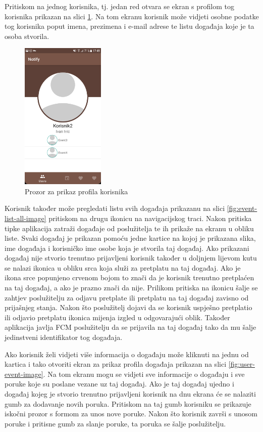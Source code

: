 \documentclass[times, utf8, zavrsni]{fer}
\begin{document}
{Pritiskom na jednog korisnika, tj. jedan red otvara se ekran s profilom tog korisnika prikazan na slici \ref{fig:user-profile-image}. Na tom ekranu korisnik može vidjeti osobne podatke tog korisnika poput imena, prezimena i e-mail adrese te listu događaja koje je ta osoba stvorila.

\begin{figure}[htb]
\centering
\includegraphics[width=4cm]{img/ss-user-profile.png}
\caption{Prozor za prikaz profila korisnika}
\label{fig:user-profile-image}
\end{figure}

Korisnik također može pregledati listu svih događaja prikazanu na slici \ref{fig:event-list-all-image} pritiskom na drugu ikonicu na navigacijskog traci. Nakon pritiska tipke aplikacija zatraži događaje od poslužitelja te ih prikaže na ekranu u obliku liste. Svaki događaj je prikazan pomoću jedne kartice na kojoj je prikazana slika, ime događaja i korisničko ime osobe koja je stvorila taj događaj. Ako prikazani događaj nije stvorio trenutno prijavljeni korisnik također u doljnjem lijevom kutu se nalazi ikonica u obliku srca koja služi za pretplatu na taj događaj. Ako je ikona srce popunjeno crvenom bojom to znači da je korisnik trenutno pretplaćen na taj događaj, a ako je prazno znači da nije. Prilikom pritiska na ikonicu šalje se zahtjev poslužitelju za odjavu pretplate ili pretplatu na taj događaj zavisno od prijašnjeg stanja. Nakon što poslužitelj dojavi da se korisnik uspješno pretplatio ili odjavio pretplatu ikonica mijenja izgled u odgovarajući oblik. Također aplikacija javlja FCM poslužitelju da se prijavila na taj događaj tako da mu šalje jedinstveni identifikator tog događaja.

Ako korisnik želi vidjeti više informacija o događaju može kliknuti na jednu od kartica i tako otvoriti ekran za prikaz profila događaja prikazan na slici \ref{fig:user-event-image}. Na tom ekranu mogu se vidjeti sve informacije o događaju i sve poruke koje su poslane vezane uz taj događaj. Ako je taj događaj ujedno i događaj kojeg je stvorio trenutno prijavljeni korisnik na dnu ekrana će se nalaziti gumb za dodavanje novih poruka. Pritiskom na taj gumb korisniku se prikazuje iskočni prozor s formom za unos nove poruke. Nakon što korisnik završi s unosom poruke i pritisne gumb za slanje poruke, ta poruka se šalje poslužitelju.

}
\end{document}
